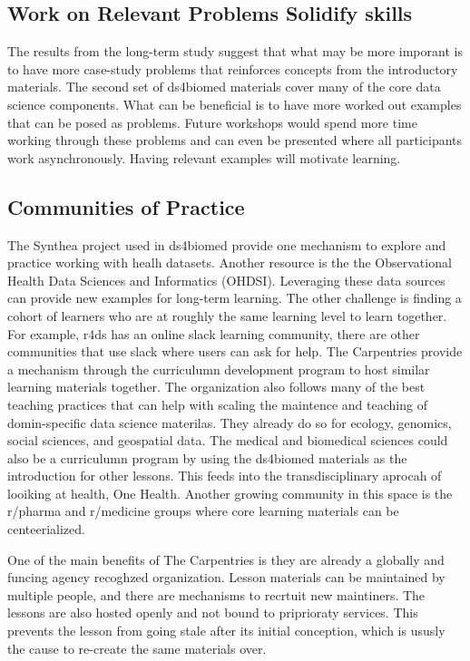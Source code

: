 \documentclass[030-workshop.tex]{subfiles}
\begin{document}
        \subsection{Work on Relevant Problems Solidify skills}

            The results from the long-term study suggest that what may be more imporant is to have
            more case-study problems that reinforces concepts from the introductory materials.
            The second set of ds4biomed materials cover many of the core data science components.
            What can be beneficial is to have more worked out examples that can be posed as problems.
            Future workshops would spend more time working through these problems and can even be presented
            where all participants work asynchronously.
            Having relevant examples will motivate learning.


    \subsection{Communities of Practice}

        The Synthea project used in ds4biomed provide one mechanism to explore and practice working with healh datasets.
        Another resource is the the Observational Health Data Sciences and Informatics (OHDSI).
        Leveraging these data sources can provide new examples for long-term learning.
        The other challenge is finding a cohort of learners who are at roughly the same learning level to learn together.
        For example, r4ds has an online slack learning community,
        there are other communities that use slack where users can ask for help.
        The Carpentries provide a mechanism through the curriculumn development program to host similar learning materials together.
        The organization also follows many of the best teaching practices that can help with scaling the maintence and
        teaching of domin-specific data science materilas.
        They already do so for ecology, genomics, social sciences, and geospatial data.
        The medical and biomedical sciences could also be a curriculumn program by using the ds4biomed materials as the introduction
        for other lessons.
        This feeds into the transdisciplinary aprocah of looiking at health, One Health.
        Another growing community in this space is the r/pharma and r/medicine groups where core learning materials
        can be centeerialized.

        One of the main benefits of The Carpentries is they are already a globally and funcing agency recoghzed organization.
        Lesson materials can be maintained by multiple people, and there are mechanisms to recrtuit new maintiners.
        The lessons are also hosted openly and not bound to priprioraty services.
        This prevents the lesson from going stale after its initial conception,
        which is ususly the cause to re-create the same materials over.
\end{document}

